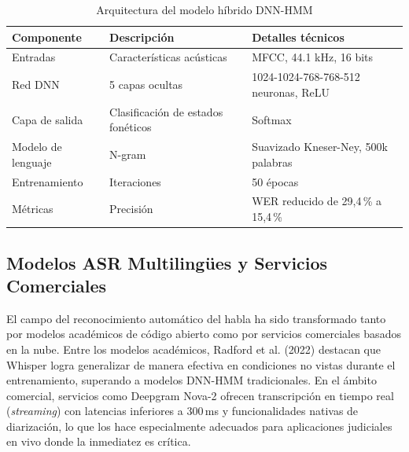 \documentclass[12pt,a4paper,oneside]{report}
\begin{document}
\begin{table}[H]
\centering
\caption{Arquitectura del modelo híbrido DNN-HMM}
\begin{tabular}{|p{3.5cm}|p{4cm}|p{4cm}|}
\hline
\rowcolor{gray!20}
\textbf{Componente} & \textbf{Descripción} & \textbf{Detalles técnicos} \\
\hline
Entradas & Características acústicas & MFCC, 44.1 kHz, 16 bits \\
\hline
Red DNN & 5 capas ocultas & 1024-1024-768-768-512 neuronas, ReLU \\
\hline
Capa de salida & Clasificación de estados fonéticos & Softmax \\
\hline
Modelo de lenguaje & N-gram & Suavizado Kneser-Ney, 500k palabras \\
\hline
Entrenamiento & Iteraciones & 50 épocas \\
\hline
Métricas & Precisión & WER reducido de 29,4\,\% a 15,4\,\% \\
\hline
\end{tabular}
\label{tab:dnn_hmm}
\end{table}

\subsection{Modelos ASR Multilingües y Servicios Comerciales}

El campo del reconocimiento automático del habla ha sido transformado tanto por modelos académicos de código abierto como por servicios comerciales basados en la nube. Entre los modelos académicos, Radford et al. (2022) destacan que Whisper logra generalizar de manera efectiva en condiciones no vistas durante el entrenamiento, superando a modelos DNN-HMM tradicionales. En el ámbito comercial, servicios como Deepgram Nova-2 ofrecen transcripción en tiempo real (\textit{streaming}) con latencias inferiores a 300\,ms y funcionalidades nativas de diarización, lo que los hace especialmente adecuados para aplicaciones judiciales en vivo donde la inmediatez es crítica.
\end{document}
